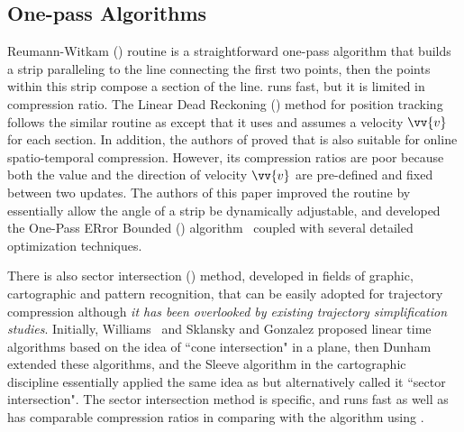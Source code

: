 
\vspace{-1ex}
\subsection{One-pass Algorithms}

Reumann-Witkam (\rwa) routine \cite{Reumann:Strip} is a straightforward one-pass algorithm that builds a strip paralleling to the line connecting the first two points, then the points within this strip compose a section of the line. \rwa runs fast, but it is limited in compression ratio.
%
The Linear Dead Reckoning (\ldr) method \cite{Lange:Tracking} for position tracking follows the similar routine as \rwa except that it uses \sed and assumes a velocity ${\vv{v}}$ for each section. In addition, the authors of \cite{Trajcevski:DDR} proved that \ldr is also suitable for online spatio-temporal compression. %
However, its compression ratios are poor because both the value and the direction of velocity ${\vv{v}}$ are pre-defined and fixed between two updates.
%
The authors of this paper improved the \rwa routine by essentially allow the angle of a strip be dynamically adjustable, and developed the One-Pass ERror Bounded (\operb) algorithm~\cite{Lin:Operb} coupled with several detailed optimization techniques.

There is also {sector intersection (\siped)} method, developed in fields of graphic, cartographic and pattern recognition, that can be easily adopted for trajectory compression although \textit{it has been overlooked by existing trajectory simplification studies}.
Initially, Williams~\cite{Williams:Longest} and Sklansky and Gonzalez \cite{Sklansky:Cone} proposed linear time algorithms based on the idea of ``cone intersection" in a plane, then Dunham \cite{Dunham:Cone} extended these algorithms, and the Sleeve algorithm \cite{Zhao:Sleeve} in the cartographic discipline
essentially applied the same idea as \siped but alternatively called it ``sector intersection".
The sector intersection method is \ped specific, and runs fast as well as has comparable compression ratios in comparing with the \dpa algorithm using \ped.
%

